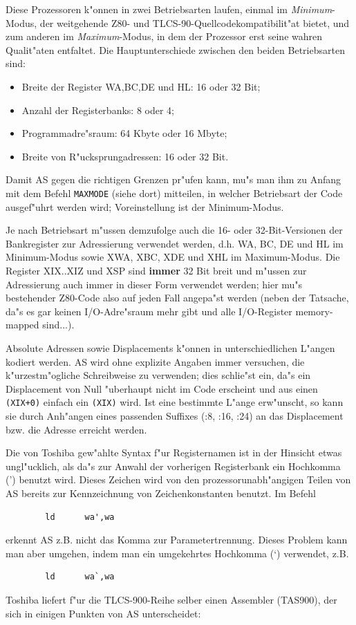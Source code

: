 \documentclass[12pt,a4paper,twoside]{report}
\newcommand{\ii}[1]{{\it #1}}
\newcommand{\bb}[1]{{\bf #1}}
\newcommand{\tty}[1]{{\tt #1}}
\newcommand{\asname}{AS}
\begin{document}
Diese Prozessoren k"onnen in zwei Betriebsarten laufen, einmal im
\ii{Minimum}-Modus, der weitgehende Z80- und TLCS-90-Quellcodekompatibilit"at
bietet, und zum anderen im \ii{Maximum}-Modus, in dem der Prozessor
erst seine wahren Qualit"aten entfaltet.  Die Hauptunterschiede zwischen
den beiden Betriebsarten sind:
\begin{itemize}
\item{Breite der Register WA,BC,DE und HL: 16 oder 32 Bit;}
\item{Anzahl der Registerbanks: 8 oder 4;}
\item{Programmadre"sraum: 64 Kbyte oder 16 Mbyte;}
\item{Breite von R"ucksprungadressen: 16 oder 32 Bit.}
\end{itemize}
Damit \asname{} gegen die richtigen Grenzen pr"ufen kann, mu"s man ihm zu Anfang
mit dem Befehl \tty{MAXMODE} (siehe dort) mitteilen, in welcher Betriebsart
der Code ausgef"uhrt werden wird; Voreinstellung ist der Minimum-Modus.
\par
Je nach Betriebsart m"ussen demzufolge auch die 16- oder 32-Bit-Versionen
der Bankregister zur Adressierung verwendet werden, d.h. WA, BC, DE und HL
im Minimum-Modus sowie XWA, XBC, XDE und XHL im Maximum-Modus.  Die Register
XIX..XIZ und XSP sind \bb{immer} 32 Bit breit und m"ussen zur Adressierung
auch immer in dieser Form verwendet werden; hier mu"s bestehender Z80-Code
also auf jeden Fall angepa"st werden (neben der Tatsache, da"s es gar keinen
I/O-Adre"sraum mehr gibt und alle I/O-Register memory-mapped sind...).
\par
Absolute Adressen sowie Displacements k"onnen in unterschiedlichen L"angen
kodiert werden.  \asname{} wird ohne explizite Angaben immer versuchen, die
k"urzestm"ogliche Schreibweise zu verwenden; dies schlie"st ein, da"s ein
Displacement von Null "uberhaupt nicht im Code erscheint und aus einen
\verb!(XIX+0)! einfach ein \verb!(XIX)! wird.  Ist eine bestimmte L"ange
erw"unscht, so kann sie durch Anh"angen eines passenden Suffixes (:8, :16,
:24) an das Displacement bzw. die Adresse erreicht werden.
\par
Die von Toshiba gew"ahlte Syntax f"ur Registernamen ist in der Hinsicht
etwas ungl"ucklich, als da"s zur Anwahl der vorherigen Registerbank ein
Hochkomma (') benutzt wird.
Dieses Zeichen wird von den prozessorunabh"angigen Teilen von \asname{} bereits zur
Kennzeichnung von Zeichenkonstanten benutzt.  Im Befehl
\begin{verbatim}
        ld      wa',wa
\end{verbatim}
erkennt \asname{} z.B. nicht das Komma zur Parametertrennung.
Dieses Problem kann man aber umgehen,
indem man ein umgekehrtes Hochkomma (`) verwendet, z.B.
\begin{verbatim}
        ld      wa`,wa
\end{verbatim}
Toshiba liefert f"ur die TLCS-900-Reihe selber einen Assembler (TAS900), der
sich in einigen Punkten von \asname{} unterscheidet:
\end{document}
